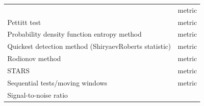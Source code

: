 \documentclass[12pt,twoside,openany]{reedthesis}
\begin{document}
\begin{longtable}[]{@{}lc@{}}
\begin{minipage}[t]{0.43\columnwidth}
\end{minipage} & \begin{minipage}[t]{0.35\columnwidth}\centering
metric\strut
\end{minipage}\tabularnewline
\begin{minipage}[t]{0.43\columnwidth}\raggedright
Pettitt test\strut
\end{minipage} & \begin{minipage}[t]{0.35\columnwidth}\centering
metric\strut
\end{minipage}\tabularnewline
\begin{minipage}[t]{0.43\columnwidth}\raggedright
Probability density function
entropy method\strut
\end{minipage} & \begin{minipage}[t]{0.35\columnwidth}\centering
metric\strut
\end{minipage}\tabularnewline
\begin{minipage}[t]{0.43\columnwidth}\raggedright
Quickest detection method
(ShiryaevRoberts
statistic)\strut
\end{minipage} & \begin{minipage}[t]{0.35\columnwidth}\centering
metric\strut
\end{minipage}\tabularnewline
\begin{minipage}[t]{0.43\columnwidth}\raggedright
Rodionov method\strut
\end{minipage} & \begin{minipage}[t]{0.35\columnwidth}\centering
metric\strut
\end{minipage}\tabularnewline
\begin{minipage}[t]{0.43\columnwidth}\raggedright
STARS\strut
\end{minipage} & \begin{minipage}[t]{0.35\columnwidth}\centering
metric\strut
\end{minipage}\tabularnewline
\begin{minipage}[t]{0.43\columnwidth}\raggedright
Sequential tests/moving
windows\strut
\end{minipage} & \begin{minipage}[t]{0.35\columnwidth}\centering
metric\strut
\end{minipage}\tabularnewline
\begin{minipage}[t]{0.43\columnwidth}\raggedright
Signal-to-noise ratio\strut
\end{minipage} & \begin{minipage}[t]{0.35\columnwidth}\centering

\end{minipage}
\end{longtable}
\end{document}
